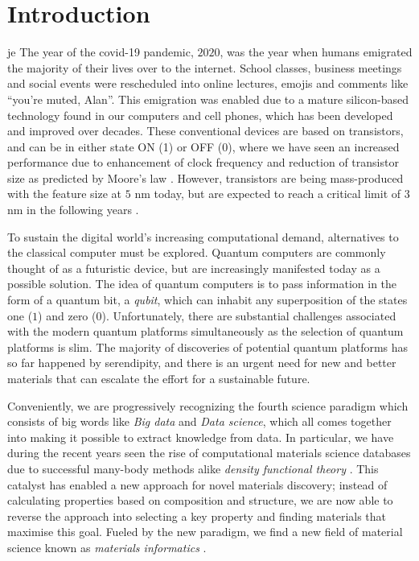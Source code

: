\chapter{Introduction}
je
The year of the covid-19 pandemic, $2020$, was the year when humans emigrated the majority of their lives over to the internet. School classes, business meetings and social events were rescheduled into online lectures, emojis and comments like ``you're muted, Alan''. This emigration was enabled due to a mature silicon-based technology found in our computers and cell phones, which has been developed and improved over decades. These conventional devices are based on transistors, and can be in either state ON (1) or OFF (0), where we have seen an increased performance due to enhancement of clock frequency and reduction of transistor size as predicted by Moore's law \cite{Moore1965, Pavicic2006}. However, transistors are being mass-produced with the feature size at $5$ nm today, but are expected to reach a critical limit of $3$ nm in the following years \cite{Gwennap2020}.



To sustain the digital world's increasing computational demand, alternatives to the classical computer must be explored. Quantum computers are commonly thought of as a futuristic device, but are increasingly manifested today as a possible solution. The idea of quantum computers is to pass information in the form of a quantum bit, a \textit{qubit}, which can inhabit any superposition of the states one ($1$) and zero ($0$). Unfortunately, there are substantial challenges associated with the modern quantum platforms simultaneously as the selection of quantum platforms is slim. The majority of discoveries of potential quantum platforms has so far happened by serendipity, and there is an urgent need for new and better materials that can escalate the effort for a sustainable future.

Conveniently, we are progressively recognizing the fourth science paradigm which consists of big words like \textit{Big data} and \textit{Data science}, which all comes together into making it possible to extract knowledge from data. In particular, we have during the recent years seen the rise of computational materials science databases \cite{Curtarolo2012, Curtarolo2012a, Calderon2015, Jain2013, Jain2016, Jain2018, Saal2013, Kirklin2015, Choudhary2020, Allen1987} due to successful many-body methods alike \textit{density functional theory} \cite{Kohn1965}. This catalyst has enabled a new approach for novel materials discovery; instead of calculating properties based on composition and structure, we are now able to reverse the approach into selecting a key property and finding materials that maximise this goal.
Fueled by the new paradigm, we find a new field of material science known as \textit{materials informatics} \cite{Rajan2005}.

